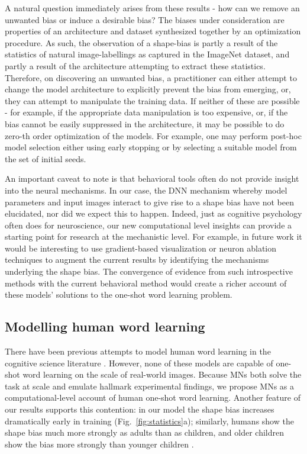 \documentclass{article}
\begin{document}
A natural question immediately arises from these results - how can we remove an unwanted bias or induce a desirable bias? The biases under consideration are properties of an architecture and dataset synthesized together by an optimization procedure. As such, the observation of a shape-bias is partly a result of the statistics of natural image-labellings as captured in the ImageNet dataset, and partly a result of the architecture attempting to extract these statistics. Therefore, on discovering an unwanted bias, a practitioner can either attempt to change the model architecture to explicitly prevent the bias from emerging, or, they can attempt to manipulate the training data. If neither of these are possible - for example, if the appropriate data manipulation is too expensive, or, if the bias cannot be easily suppressed in the architecture, it may be possible to do zero-th order optimization of the models. For example, one may perform post-hoc model selection either using early stopping or by selecting a suitable model from the set of initial seeds.

An important caveat to note is that behavioral tools often do not provide insight into the neural mechanisms. In our case, the DNN mechanism whereby model parameters and input images interact to give rise to a shape bias have not been elucidated, nor did we expect this to happen. Indeed, just as cognitive psychology often does for neuroscience, our new computational level insights can provide a starting point for research at the mechanistic level. For example, in future work it would be interesting to use gradient-based visualization or neuron ablation techniques to augment the current results by identifying the mechanisms underlying the shape bias. The convergence of evidence from such introspective methods with the current behavioral method would create a richer account of these models' solutions to the one-shot word learning problem.

\subsection{Modelling human word learning}

There have been previous attempts to model human word learning in the cognitive science literature \citep{colunga2005lexicon,xu2007word,schilling2012taking,mayor2010neurocomputational}. However, none of these models are capable of one-shot word learning on the scale of real-world images. Because MNs both solve the task at scale and emulate hallmark experimental findings, we propose MNs as a computational-level account of human one-shot word learning. Another feature of our results supports this contention: in our model the shape bias increases dramatically early in training (Fig.~\ref{fig:statistics}a); similarly, humans show the shape bias much more strongly as adults than as children, and older children show the bias more strongly than younger children \citep{landau1988importance}.
\end{document}
